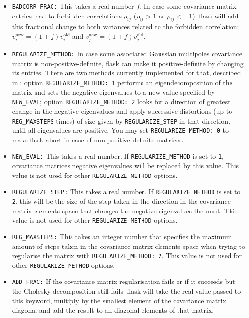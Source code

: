 \documentclass[12pt]{book} %
\newcommand{\nv}[1]{\mathrm{#1}}                 %
\begin{document}
\begin{itemize}
\item {\tt BADCORR\_FRAC:} This takes a real number $f$. In case some covariance matrix entries 
  lead to forbidden correlations $\rho_{ij}$ ($\rho_{ij}>1$ or $\rho_{ij}<-1$), {\sc flask} will 
  add this fractional change to both variances related to the forbidden correlation: 
  $v_i^{\nv{new}} = (1+f)v_i^{\nv{old}}$ and $v_j^{\nv{new}} = (1+f)v_j^{\nv{old}}$.

\item {\tt REGULARIZE\_METHOD:} In case some associated Gaussian multipoles covariance matrix 
  is non-positive-definite, {\sc flask} can make it positive-definite by changing its entries. 
  There are two methods currently implemented for that, described in \citet{Xavier16mn}: option 
  {\tt REGULARIZE\_METHOD: 1} performs an eigendecomposition of the matrix and sets the negative eigenvalues to a 
  new value specified by {\tt NEW\_EVAL}; option {\tt REGULARIZE\_METHOD: 2} looks for a direction of greatest 
  change in the negative eigenvalues and apply successive distortions (up to {\tt REG\_MAXSTEPS} 
  times) of size given by {\tt REGULARIZE\_STEP} in that direction, until all eigenvalues are positive. You may set 
  {\tt REGULARIZE\_METHOD: 0} to make {\sc flask} abort in case of non-positive-definite matrices. 

\item {\tt NEW\_EVAL:} This takes a real number. If {\tt REGULARIZE\_METHOD} is set to {\tt 1}, 
  covariance matrices negative eigenvalues will be replaced by this value. This value is not used 
  for other {\tt REGULARIZE\_METHOD} options.

\item {\tt REGULARIZE\_STEP:} This takes a real number. If {\tt REGULARIZE\_METHOD} is set to {\tt 2},
  this will be the size of the step taken in the direction in the covariance matrix elements space that 
  changes the negative eigenvalues the most.  This value is not used for other {\tt REGULARIZE\_METHOD} 
  options.
  
\item {\tt REG\_MAXSTEPS:} This takes an integer number that specifies the maximum amount of 
  steps taken in the covariance matrix elements space when trying to regularise the matrix 
  with {\tt REGULARIZE\_METHOD: 2}. This value is not used for other {\tt REGULARIZE\_METHOD} 
  options. 

\item {\tt ADD\_FRAC:} If the covariance matrix regularisation fails or if it succeeds but the 
  Cholesky decomposition still fails, {\sc flask} will take the real value passed to this keyword, 
  multiply by the smallest element of the covariance matrix diagonal and add the result to all 
  diagonal elements of that matrix. 


\end{itemize}
\end{document}
